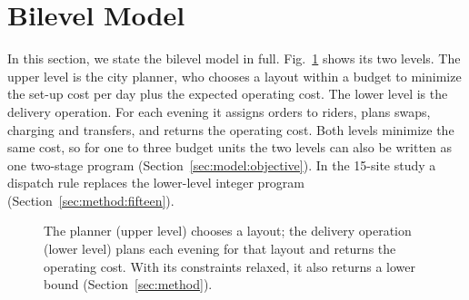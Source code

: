 \providecommand{\rSC}{\textsf{SC}}
\providecommand{\rS}{\textsf{S}}
\providecommand{\rC}{\textsf{C}}
\providecommand{\OPEX}{\mathrm{OPEX}}
\providecommand{\UB}{\mathrm{UB}}
\providecommand{\LB}{\mathrm{LB}}
\providecommand{\Vopen}{V^{\mathrm{open}}}
\providecommand{\Vall}{V^{\mathrm{all}}}

\section{Bilevel Model}\label{sec:setup}\label{sec:bilevel}

In this section, we state the bilevel model in full. Fig.~\ref{fig:bilevel} shows its two levels. The upper level is the city planner, who chooses a layout within a budget to minimize the set-up cost per day plus the expected operating cost. The lower level is the delivery operation. For each evening it assigns orders to riders, plans swaps, charging and transfers, and returns the operating cost. Both levels minimize the same cost, so for one to three budget units the two levels can also be written as one two-stage program (Section~\ref{sec:model:objective}). In the 15-site study a dispatch rule replaces the lower-level integer program (Section~\ref{sec:method:fifteen}).

\begin{figure}[t]
  \centering
  \caption{The planner (upper level) chooses a layout; the delivery operation (lower level) plans each evening for that layout and returns the operating cost. With its constraints relaxed, it also returns a lower bound (Section~\ref{sec:method}).}
  \label{fig:bilevel}
\end{figure}

